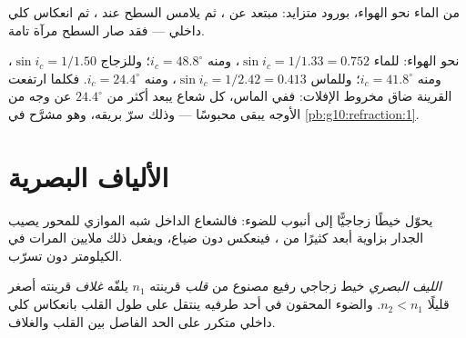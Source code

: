 \begin{omfigure}

{\small من الماء نحو الهواء، بورود متزايد:  مبتعد
عن ، ثم  يلامس السطح عند
، ثم انعكاس كلي داخلي --- فقد صار السطح
مرآة تامة.}
\end{omfigure}

\begin{example}\label{ex:g10:refraction:criticalvalues}
نحو الهواء: للماء $\sin i_c = 1/1.33 = 0.752$، ومنه
$i_c = 48.8^\circ$؛ وللزجاج $\sin i_c = 1/1.50$، ومنه
$i_c = 41.8^\circ$؛ وللماس $\sin i_c = 1/2.42 = 0.413$، ومنه
$i_c = 24.4^\circ$. فكلما ارتفعت القرينة ضاق مخروط الإفلات:
ففي الماس، كل شعاع يبعد أكثر من $24.4^\circ$ عن  وجه من الأوجه
يبقى محبوسًا --- وذلك سرّ بريقه، وهو مشرَّح في
\cref{pb:g10:refraction:1}.
\end{example}

\section{الألياف البصرية}

يحوّل  خيطًا زجاجيًّا إلى أنبوب للضوء:
فالشعاع الداخل شبه الموازي للمحور يصيب الجدار بزاوية أبعد كثيرًا
من ، فينعكس دون ضياع، ويفعل ذلك ملايين المرات
في الكيلومتر دون تسرّب.

\begin{definition}\label{def:g10:refraction:fiber}
\emph{الليف البصري} خيط زجاجي رفيع مصنوع
من \emph{قلب} قرينته $n_1$ يلفّه
\emph{غلاف} قرينته أصغر قليلًا $n_2 < n_1$.
والضوء المحقون في أحد طرفيه ينتقل على طول القلب بانعكاس كلي
داخلي متكرر على الحد الفاصل بين القلب والغلاف.
\end{definition}

